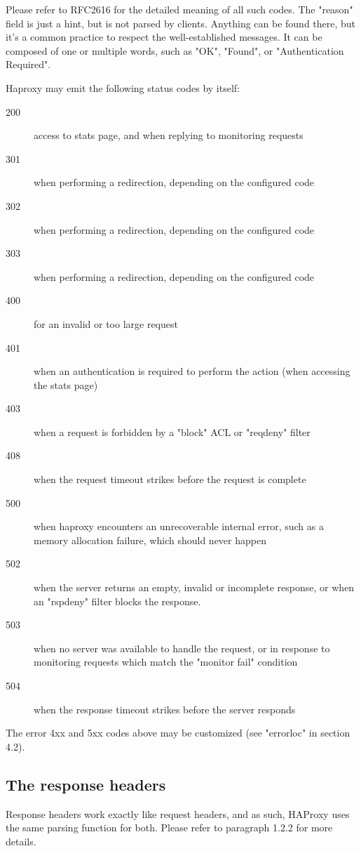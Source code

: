 Please refer to RFC2616 for the detailed meaning of all such codes. The
"reason" field is just a hint, but is not parsed by clients. Anything can be
found there, but it's a common practice to respect the well-established
messages. It can be composed of one or multiple words, such as "OK", "Found",
or "Authentication Required".

Haproxy may emit the following status codes by itself:

\begin{description}
  \item[200] access to stats page, and when replying to monitoring requests
  \item[301] when performing a redirection, depending on the configured code
  \item[302] when performing a redirection, depending on the configured code
  \item[303] when performing a redirection, depending on the configured code
  \item[400] for an invalid or too large request
  \item[401] when an authentication is required to perform the action (when
        accessing the stats page)
  \item[403] when a request is forbidden by a "block" ACL or "reqdeny" filter
  \item[408] when the request timeout strikes before the request is complete
  \item[500] when haproxy encounters an unrecoverable internal error, such as a
        memory allocation failure, which should never happen
  \item[502] when the server returns an empty, invalid or incomplete response, or
        when an "rspdeny" filter blocks the response.
  \item[503] when no server was available to handle the request, or in response to
        monitoring requests which match the "monitor fail" condition
  \item[504] when the response timeout strikes before the server responds
\end{description}

The error 4xx and 5xx codes above may be customized (see "errorloc" in section
4.2).

\subsection{The response headers}
Response headers work exactly like request headers, and as such, HAProxy uses
the same parsing function for both. Please refer to paragraph 1.2.2 for more
details.
